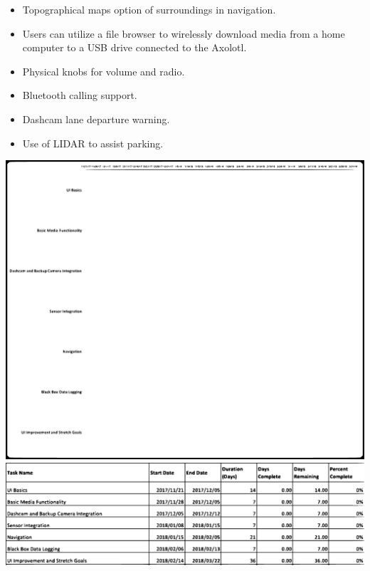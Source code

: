 \documentclass[onecolumn, draftclsnofoot,10pt, compsoc]{IEEEtran}
\begin{document}
\begin{itemize}
\begin{itemize}
		\item Topographical maps option of surroundings in navigation.
		\item Users can utilize a file browser to wirelessly download media from a home computer to a USB drive connected to the Axolotl.
		\item Physical knobs for volume and radio.
		\item Bluetooth calling support.
		\item Dashcam lane departure warning.
		\item Use of LIDAR to assist parking.
		\end{itemize}
\end{itemize}
\includegraphics[scale=1, bb=0 0 30 30]{gantt.eps}
\includegraphics[scale=1, bb=0 0 30 30]{tablegantt.eps}
\end{document}
